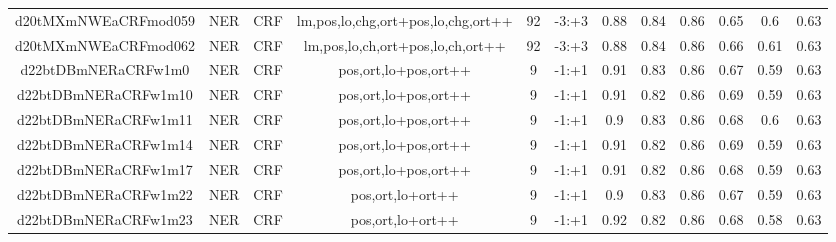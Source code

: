 \documentclass[a4paper]{article}
\begin{document}
\begin{landscape}
\begin{center}
\begin{tabular}{ |c|c|c|c|c|c|c|c|c|c|c|c|}
 
 	
 	\small{ d20tMXmNWEaCRFmod059 } & \small{ NER} & \small{  CRF }  & lm,pos,lo,chg,ort+pos,lo,chg,ort++  &  92 &  \small{  -3:+3 }  &  0.88 & 0.84 & 0.86  &  0.65 & 0.6 & 0.63 \\
 	

 
 	
 	\small{ d20tMXmNWEaCRFmod062 } & \small{ NER} & \small{  CRF }  & lm,pos,lo,ch,ort+pos,lo,ch,ort++  &  92 &  \small{  -3:+3 }  &  0.88 & 0.84 & 0.86  &  0.66 & 0.61 & 0.63 \\
 	

 
 	
 	\small{ d22btDBmNERaCRFw1m0 } & \small{ NER} & \small{  CRF }  & pos,ort,lo+pos,ort++  &  9 &  \small{  -1:+1 }  &  0.91 & 0.83 & 0.86  &  0.67 & 0.59 & 0.63 \\
 	

 
 	
 	\small{ d22btDBmNERaCRFw1m10 } & \small{ NER} & \small{  CRF }  & pos,ort,lo+pos,ort++  &  9 &  \small{  -1:+1 }  &  0.91 & 0.82 & 0.86  &  0.69 & 0.59 & 0.63 \\
 	

 
 	
 	\small{ d22btDBmNERaCRFw1m11 } & \small{ NER} & \small{  CRF }  & pos,ort,lo+pos,ort++  &  9 &  \small{  -1:+1 }  &  0.9 & 0.83 & 0.86  &  0.68 & 0.6 & 0.63 \\
 	

 
 	
 	\small{ d22btDBmNERaCRFw1m14 } & \small{ NER} & \small{  CRF }  & pos,ort,lo+pos,ort++  &  9 &  \small{  -1:+1 }  &  0.91 & 0.82 & 0.86  &  0.69 & 0.59 & 0.63 \\
 	

 
 	
 	\small{ d22btDBmNERaCRFw1m17 } & \small{ NER} & \small{  CRF }  & pos,ort,lo+pos,ort++  &  9 &  \small{  -1:+1 }  &  0.91 & 0.82 & 0.86  &  0.68 & 0.59 & 0.63 \\
 	

 
 	
 	\small{ d22btDBmNERaCRFw1m22 } & \small{ NER} & \small{  CRF }  & pos,ort,lo+ort++  &  9 &  \small{  -1:+1 }  &  0.9 & 0.83 & 0.86  &  0.67 & 0.59 & 0.63 \\
 	

 
 	
 	\small{ d22btDBmNERaCRFw1m23 } & \small{ NER} & \small{  CRF }  & pos,ort,lo+ort++  &  9 &  \small{  -1:+1 }  &  0.92 & 0.82 & 0.86  &  0.68 & 0.58 & 0.63 \\
 	


\end{tabular}
\end{center}
\end{landscape}
\end{document}
